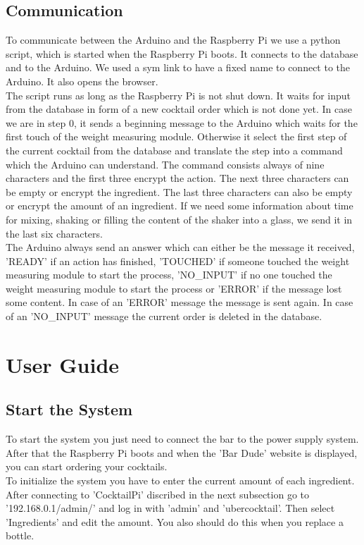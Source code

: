 \documentclass{acm_proc_article-sp}
\begin{document}
\subsection{Communication}
To communicate between the Arduino and the Raspberry Pi we use a python script, which is started when the Raspberry Pi boots. It connects to the database and to the Arduino. We used a sym link to have a fixed name to connect to the Arduino. It also opens the browser. \\
The script runs as long as the Raspberry Pi is not shut down. It waits for input from the database in form of a new cocktail order which is not done yet. In case we are in step 0, it sends a beginning message to the Arduino which waits for the first touch of the weight measuring module. Otherwise it select the first step of the current cocktail from the database and translate the step into a command which the Arduino can understand. The command consists always of nine characters and the first three encrypt the action. The next three characters can be empty or encrypt the ingredient. The last three characters can also be empty or encrypt the amount of an ingredient. If we need some information about time for mixing, shaking or filling the content of the shaker into a glass, we send it in the last six characters. \\
The Arduino always send an answer which can either be the message it received, 'READY' if an action has finished, 'TOUCHED' if someone touched the weight measuring module to start the process, 'NO\_INPUT' if no one touched the weight measuring module to start the process or 'ERROR' if the message lost some content. In case of an 'ERROR' message the message is sent again. In case of an 'NO\_INPUT' message the current order is deleted in the database.
\section{User Guide}
\subsection{Start the System}
To start the system you just need to connect the bar to the power supply system. After that the Raspberry Pi boots and when the 'Bar Dude' website is displayed, you can start ordering your cocktails. \\
To initialize the system you have to enter the current amount of each ingredient. After connecting to 'CocktailPi' discribed in the next subsection go to '192.168.0.1/admin/' and log in with 'admin' and 'ubercocktail'. Then select 'Ingredients' and edit the amount. You also should do this when you replace a bottle.
\end{document}
